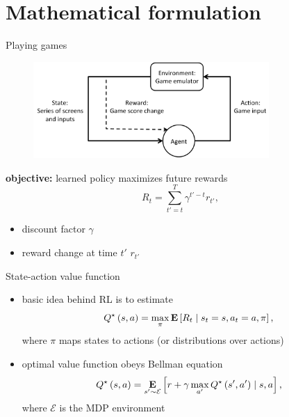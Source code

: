 \section{Mathematical formulation}

\begin{frame}{Playing games}
    \begin{figure}
        \centering
        \includegraphics[width=0.8\textwidth]{background.pdf}
    \end{figure}
    \textbf{objective:} learned policy maximizes future rewards
    \[
        R_{t} = \sum_{t'=t}^{T} \gamma^{t'-t}r_{t'},
    \]
    \begin{itemize}
        \item discount factor $\gamma$
        \item reward change at time $t'$ $r_{t'}$
    \end{itemize}
\end{frame}

\begin{frame}{State-action value function}
    \begin{itemize}\itemsep=12pt
        
        \item basic idea behind RL is to estimate
        \[
            Q^{\star}\left(s, a\right) = 
            \max_{\pi}\mathop{\bf E{}}\left[R_{t} \mid s_{t} = s, a_{t} = a, \pi \right],
        \]
        where $\pi$ maps states to actions (or distributions over actions)

        \item optimal value function obeys Bellman equation
        \[
            Q^{\star}\left(s,a\right) = 
            \mathop{\bf E{}}_{s' \sim \mathcal{E}} \left[r + \gamma \max_{a'}Q^{\star}\left(s',a'\right)\mid s, a \right],
        \]
        where $\mathcal{E}$ is the MDP environment

    \end{itemize}
\end{frame}

